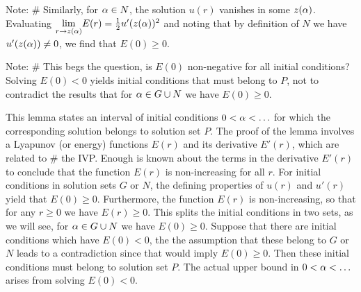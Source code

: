 Note: \# Similarly, for $\alpha\in N$, the solution $u(r)$ vanishes in some $z(\alpha)$.
Evaluating $\underset{r\to z(\alpha)}{\lim}E(r)=\frac{1}{2}u'(z(\alpha))^2$ and noting that
by definition of $N$ we have $u'(z(\alpha))\neq0$, we find that $E(0)\geq0$.

Note: \# This begs the question, is $E(0)$ non-negative for all initial
conditions? Solving $E(0)<0$ yields initial conditions that must belong to $P$,
not to contradict the results that for $\alpha\in G\cup N$ we have $E(0)\geq0$.

This lemma states an interval of initial conditions $0<\alpha<\ldots$ for which the
corresponding  solution belongs to solution set $P$. The proof of the lemma
involves a Lyapunov (or energy) functions $E(r)$ and its derivative $E'(r)$,
which are related to \# the IVP. Enough is known about the terms in the
derivative $E'(r)$ to conclude that the function $E(r)$ is non-increasing for
all $r$. For initial conditions in solution sets $G$ or $N$, the defining
properties of $u(r)$ and $u'(r)$ yield that $E(0)\geq0$. Furthermore, the
function $E(r)$ is non-increasing, so that for any $r\geq0$ we have
$E(r)\geq0$. This splits the initial conditions in two sets, as we will see,
for $\alpha\in G\cup N$ we have $E(0)\geq0$. Suppose that there are initial
conditions which have $E(0)<0$, the the assumption that these belong to $G$ or
$N$ leads to a contradiction since that would imply $E(0)\geq0$. Then these
initial conditions must belong to solution set $P$. The actual upper bound in
$0<\alpha<\ldots$ arises from solving $E(0)<0$.

